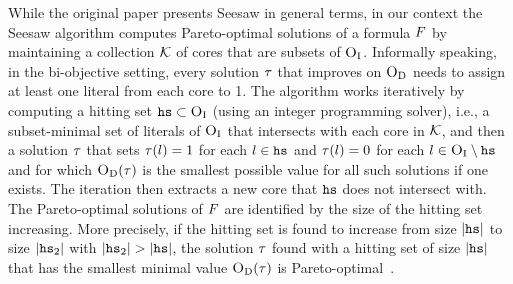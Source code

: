 While the original paper presents Seesaw in general terms, in our context the Seesaw algorithm computes Pareto-optimal solutions of a formula $F$ by maintaining a collection $\mathcal{K}$ of cores that are subsets of $\textsc{O}_{\text{I}}$.
Informally speaking, in the bi-objective setting, every solution $\tau$ that improves on $\textsc{O}_{\text{D}}$ needs to assign at least one literal from each core to 1.
The algorithm works iteratively by computing a hitting set $\texttt{hs} \subset \textsc{O}_{\text{I}}$ (using an integer programming solver), i.e., a subset-minimal set of literals of $\textsc{O}_{\text{I}}$ that intersects with each core in $\mathcal{K}$, and then a solution $\tau$ that sets $\tau(l) = 1$ for each $l \in \texttt{hs}$ and $\tau(l) = 0$ for each $l \in \textsc{O}_{\text{I}} \setminus \texttt{hs}$ and for which $\textsc{O}_{\text{D}}(\tau)$ is the smallest possible value for all such solutions if one exists.
The iteration then extracts a new core that $\texttt{hs}$ does not intersect with.
The Pareto-optimal solutions of $F$ are identified by the size of the hitting set increasing.
More precisely, if the hitting set is found to increase from size $|\texttt{hs}|$ to size $|\texttt{hs}_2|$ with $|\hs_2|>|\hs|$, the solution $\tau$ found with a hitting set of size $|\texttt{hs}|$ that has the smallest minimal value $\textsc{O}_{\text{D}}(\tau)$ is Pareto-optimal~\autocite{DBLP:conf/cp/JanotaMSM21}.

